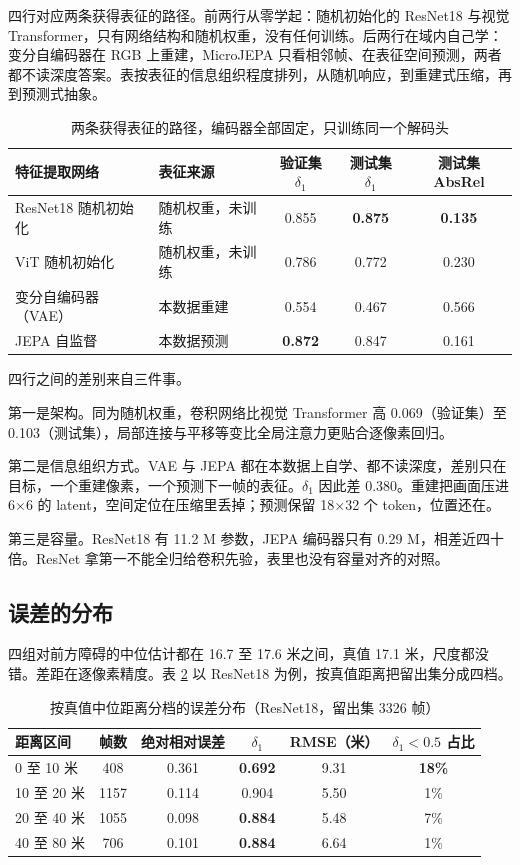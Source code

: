 \documentclass[12pt,a4paper]{ctexart}
\begin{document}
四行对应两条获得表征的路径。前两行从零学起：随机初始化的 ResNet18 与视觉 Transformer，只有网络结构和随机权重，没有任何训练。后两行在域内自己学：变分自编码器在 RGB 上重建，MicroJEPA 只看相邻帧、在表征空间预测，两者都不读深度答案。表按表征的信息组织程度排列，从随机响应，到重建式压缩，再到预测式抽象。

\begin{table}[H]
\centering
\small
\caption{两条获得表征的路径，编码器全部固定，只训练同一个解码头}
\label{tab:backbone}
\begin{tabular}{llccc}
\toprule
特征提取网络 & 表征来源 & 验证集 $\delta_1$ & 测试集 $\delta_1$ & 测试集 AbsRel \\
\midrule
ResNet18 随机初始化 & 随机权重，未训练 & 0.855 & \textbf{0.875} & \textbf{0.135} \\
ViT 随机初始化 & 随机权重，未训练 & 0.786 & 0.772 & 0.230 \\
变分自编码器（VAE） & 本数据重建 & 0.554 & 0.467 & 0.566 \\
JEPA 自监督 & 本数据预测 & \textbf{0.872} & 0.847 & 0.161 \\
\bottomrule
\end{tabular}
\end{table}

四行之间的差别来自三件事。

第一是架构。同为随机权重，卷积网络比视觉 Transformer 高 0.069（验证集）至 0.103（测试集），局部连接与平移等变比全局注意力更贴合逐像素回归。

第二是信息组织方式。VAE 与 JEPA 都在本数据上自学、都不读深度，差别只在目标，一个重建像素，一个预测下一帧的表征。$\delta_1$ 因此差 0.380。重建把画面压进 6$\times$6 的 latent，空间定位在压缩里丢掉；预测保留 18$\times$32 个 token，位置还在。

第三是容量。ResNet18 有 11.2 M 参数，JEPA 编码器只有 0.29 M，相差近四十倍。ResNet 拿第一不能全归给卷积先验，表里也没有容量对齐的对照。

\subsection{误差的分布}
\label{sec:errdist}

四组对前方障碍的中位估计都在 16.7 至 17.6 米之间，真值 17.1 米，尺度都没错。差距在逐像素精度。表 \ref{tab:distance} 以 ResNet18 为例，按真值距离把留出集分成四档。

\begin{table}[H]
\centering
\caption{按真值中位距离分档的误差分布（ResNet18，留出集 3326 帧）}
\label{tab:distance}
\begin{tabular}{lccccc}
\toprule
距离区间 & 帧数 & 绝对相对误差 & $\delta_1$ & RMSE（米） & $\delta_1<0.5$ 占比 \\
\midrule
0 至 10 米 & 408 & 0.361 & \textbf{0.692} & 9.31 & \textbf{18\%} \\
10 至 20 米 & 1157 & 0.114 & 0.904 & 5.50 & 1\% \\
20 至 40 米 & 1055 & 0.098 & \textbf{0.884} & 5.48 & 7\% \\
40 至 80 米 & 706 & 0.101 & \textbf{0.884} & 6.64 & 1\% \\
\bottomrule
\end{tabular}
\end{table}
\end{document}
